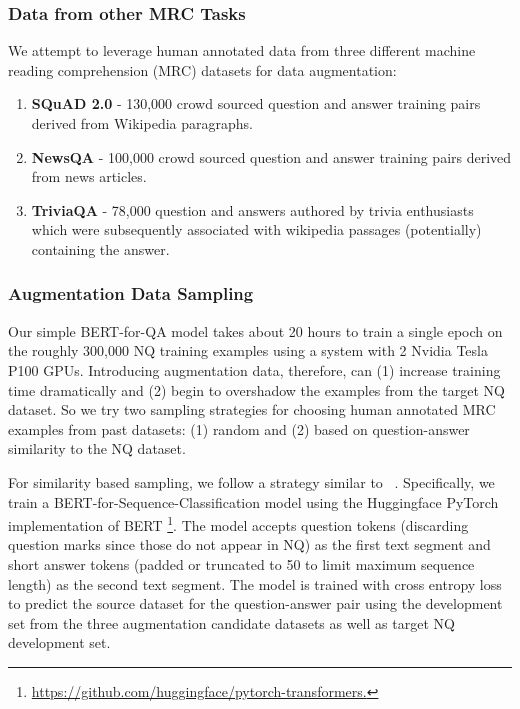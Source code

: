 \documentclass[letterpaper]{article} \usepackage{aaai20}  \usepackage{times}  \usepackage{helvet} \usepackage{courier}  \usepackage[hyphens]{url}  \usepackage{graphicx} \urlstyle{rm} \def\UrlFont{\rm}  \usepackage{graphicx}  \frenchspacing  \setlength{\pdfpagewidth}{8.5in}  \setlength{\pdfpageheight}{11in}  \usepackage{amsmath}
\newcommand{\citet}[1]{\citeauthor{#1}~\shortcite{#1}}
\begin{document}
\subsubsection{Data from other MRC Tasks}
We attempt to leverage human annotated data from three different machine reading comprehension (MRC) datasets for data augmentation:
\begin{enumerate}
    \item \textbf{SQuAD 2.0} - \raisebox{-.5ex}{\textasciitilde}130,000 crowd sourced question and answer training pairs derived from Wikipedia paragraphs.
    \item \textbf{NewsQA} \cite{newsqa} - \raisebox{-.5ex}{\textasciitilde}100,000 crowd sourced question and answer training pairs derived from news articles.
    \item \textbf{TriviaQA} \cite{DBLP:journals/corr/JoshiCWZ17} - \raisebox{-.5ex}{\textasciitilde}78,000 question and answers authored by trivia enthusiasts which were subsequently associated with wikipedia passages (potentially) containing the answer.
\end{enumerate}

\subsubsection{Augmentation Data Sampling}

Our simple BERT-for-QA model takes about 20 hours to train a single epoch on the roughly 300,000 NQ training examples using a system with 2 Nvidia\textsuperscript{\textregistered} Tesla\textsuperscript{\textregistered} P100 GPUs. Introducing augmentation data, therefore, can (1) increase training time dramatically and (2) begin to overshadow the examples from the target NQ dataset. So we try two sampling strategies for choosing human annotated MRC examples from past datasets: (1) random and (2) based on question-answer similarity to the NQ dataset.  



For similarity based sampling, we follow a strategy similar to \citet{DBLP:journals/corr/abs-1809-06963}.  Specifically, we train a BERT-for-Sequence-Classification model using the Huggingface PyTorch implementation of BERT \footnote{\url{https://github.com/huggingface/pytorch-transformers.}}. The model accepts question tokens (discarding question marks since those do not appear in NQ) as the first text segment and short answer tokens (padded or truncated to 50 to limit maximum sequence length) as the second text segment. The model is trained with cross entropy loss to predict the source dataset for the question-answer pair using the development set from the three augmentation candidate datasets as well as target NQ development set. 
\end{document}
